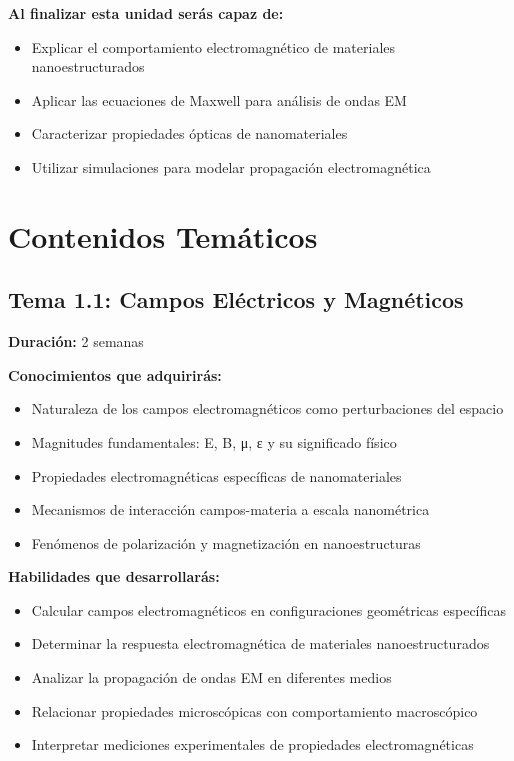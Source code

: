 \begin{tecnologiabox}
\begin{tecnologiabox}
\begin{tecnologiabox}
\begin{teknologiabox}
\begin{tecnologiabox}
\begin{tecnologiabox}
\begin{tecnologiabox}
\begin{tecnologiabox}
\begin{objetivobox}
\textbf{Al finalizar esta unidad serás capaz de:}
\begin{itemize}
	\item Explicar el comportamiento electromagnético de materiales nanoestructurados
	\item Aplicar las ecuaciones de Maxwell para análisis de ondas EM
	\item Caracterizar propiedades ópticas de nanomateriales
	\item Utilizar simulaciones para modelar propagación electromagnética
\end{itemize}
\end{objetivobox}

\section{Contenidos Temáticos}

\subsection{Tema 1.1: Campos Eléctricos y Magnéticos}
\textbf{Duración:} 2 semanas

\begin{saberbox}
\textbf{Conocimientos que adquirirás:}
\begin{itemize}
	\item Naturaleza de los campos electromagnéticos como perturbaciones del espacio
	\item Magnitudes fundamentales: E, B, μ, ε y su significado físico
	\item Propiedades electromagnéticas específicas de nanomateriales
	\item Mecanismos de interacción campos-materia a escala nanométrica
	\item Fenómenos de polarización y magnetización en nanoestructuras
\end{itemize}
\end{saberbox}

\begin{saberhacerbox}
\textbf{Habilidades que desarrollarás:}
\begin{itemize}
	\item Calcular campos electromagnéticos en configuraciones geométricas específicas
	\item Determinar la respuesta electromagnética de materiales nanoestructurados
	\item Analizar la propagación de ondas EM en diferentes medios
	\item Relacionar propiedades microscópicas con comportamiento macroscópico
	\item Interpretar mediciones experimentales de propiedades electromagnéticas
\end{itemize}
\end{saberhacerbox}


\end{tecnologiabox}
\end{tecnologiabox}
\end{tecnologiabox}
\end{tecnologiabox}
\end{teknologiabox}
\end{tecnologiabox}
\end{tecnologiabox}
\end{tecnologiabox}
